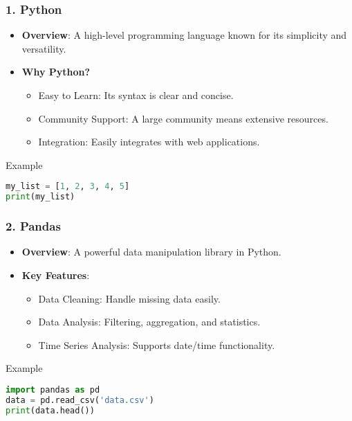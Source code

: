 \documentclass[aspectratio=169]{beamer}
\begin{document}
\begin{frame}
    \frametitle{1. Python}
    \begin{itemize}
        \item \textbf{Overview}: A high-level programming language known for its simplicity and versatility.
        \item \textbf{Why Python?}
        \begin{itemize}
            \item Easy to Learn: Its syntax is clear and concise.
            \item Community Support: A large community means extensive resources.
            \item Integration: Easily integrates with web applications.
        \end{itemize}
    \end{itemize}
    
    \begin{block}{Example}
        \begin{lstlisting}[language=Python]
my_list = [1, 2, 3, 4, 5]
print(my_list)
        \end{lstlisting}
    \end{block}
\end{frame}

\begin{frame}
    \frametitle{2. Pandas}
    \begin{itemize}
        \item \textbf{Overview}: A powerful data manipulation library in Python.
        \item \textbf{Key Features}:
        \begin{itemize}
            \item Data Cleaning: Handle missing data easily.
            \item Data Analysis: Filtering, aggregation, and statistics.
            \item Time Series Analysis: Supports date/time functionality.
        \end{itemize}
    \end{itemize}
    
    \begin{block}{Example}
        \begin{lstlisting}[language=Python]
import pandas as pd
data = pd.read_csv('data.csv')
print(data.head())
        \end{lstlisting}
    \end{block}
\end{frame}
\end{document}
